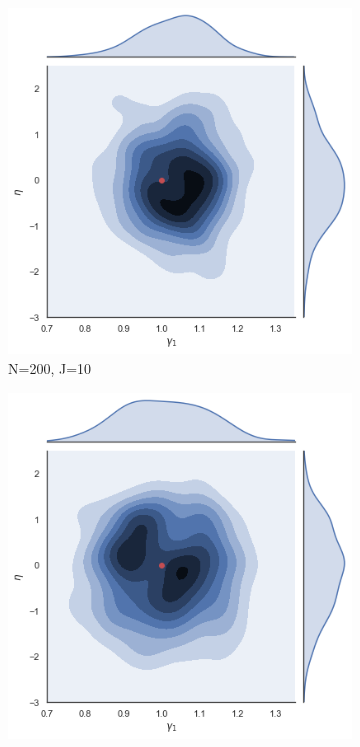 \begin{figure}[h!]
  \centering
  \begin{subfigure}[b]{0.3\linewidth}
    \includegraphics[width=\linewidth]{graphics/jointplot_gamma1eta_big}
    \caption{ N=200, J=10}
  \end{subfigure}
  \begin{subfigure}[b]{0.3\linewidth}
    \includegraphics[width=\linewidth]{graphics/jointplot_gamma1eta_small}

\end{subfigure}
\end{figure}
